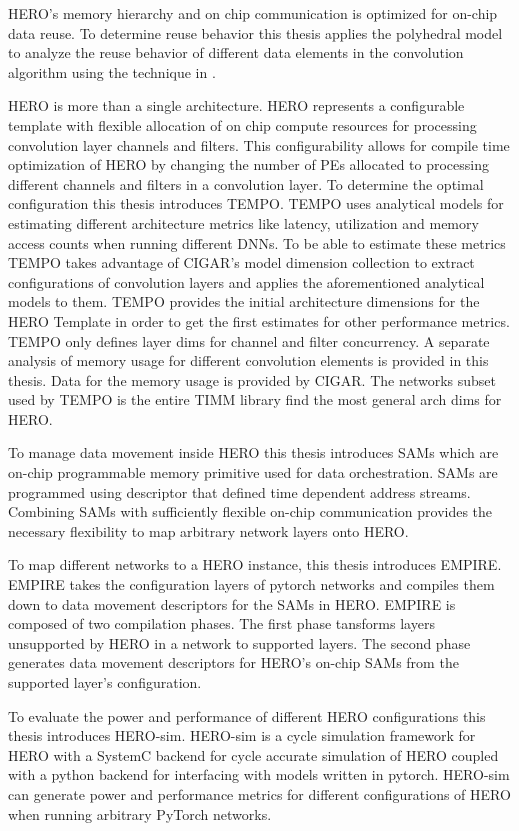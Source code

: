 HERO's memory hierarchy and on chip communication is optimized for on-chip data
reuse. To determine reuse behavior this thesis applies the polyhedral model to
analyze the reuse behavior of different data elements in the convolution
algorithm using the technique in \cite{meeus}.

HERO is more than a single architecture. HERO represents a configurable template
with flexible allocation of on chip compute resources for processing convolution
layer channels and filters. This configurability allows for compile time
optimization of HERO by changing the number of PEs allocated to processing
different channels and filters in a convolution layer. To determine the optimal
configuration this thesis introduces \ac{TEMPO}. TEMPO uses analytical models
for estimating different architecture metrics like latency, utilization and
memory access counts when running different DNNs. To be able to estimate these
metrics TEMPO takes advantage of CIGAR's model dimension collection to extract
configurations of convolution layers and applies the aforementioned analytical
models to them.   
TEMPO provides the initial architecture dimensions for the HERO Template in
order to get the first estimates for other performance metrics. TEMPO only
defines layer dims for channel and filter concurrency. A separate analysis of
memory usage for different convolution elements is provided in this thesis. Data
for the memory usage is provided by CIGAR.   
The networks subset used by TEMPO is the entire TIMM library find the most
general arch dims for HERO. 

To manage data movement inside HERO this thesis introduces \ac{SAM}s which are
on-chip programmable memory primitive used for data orchestration. SAMs are
programmed using descriptor that defined time dependent address streams.
Combining SAMs with sufficiently flexible on-chip communication provides the
necessary flexibility to map arbitrary network layers onto HERO. 

To map different networks to a HERO instance, this thesis introduces
\ac{EMPIRE}. EMPIRE takes the configuration layers of pytorch networks and
compiles them down to data movement descriptors for the SAMs in HERO.
\ac{EMPIRE} is composed of two compilation phases. The first phase tansforms
layers unsupported by HERO in a network to supported layers. The second phase
generates data movement descriptors for HERO's on-chip SAMs from the supported
layer's configuration.
   
To evaluate the power and performance of different HERO configurations this
thesis introduces HERO-sim. HERO-sim is a cycle simulation framework for HERO
with a SystemC backend for cycle accurate simulation of HERO coupled with a
python backend for interfacing with models written in pytorch. HERO-sim can
generate power and performance metrics for different configurations of HERO when
running arbitrary PyTorch networks. 

